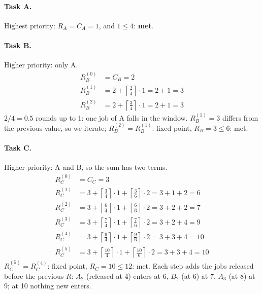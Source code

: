 \paragraph{Task A.} Highest priority: $R_A = C_A = 1$, and $1 \le 4$: \textbf{met}.

\paragraph{Task B.} Higher priority: only A.
\[
\begin{aligned}
R_B^{(0)} &= C_B = 2 \\
R_B^{(1)} &= 2 + \left\lceil \tfrac{2}{4} \right\rceil \cdot 1 = 2 + 1 = 3 \\
R_B^{(2)} &= 2 + \left\lceil \tfrac{3}{4} \right\rceil \cdot 1 = 2 + 1 = 3
\end{aligned}
\]
$2/4 = 0.5$ rounds up to 1: one job of A falls in the window. $R_B^{(1)} = 3$ differs from the previous value, so we iterate; $R_B^{(2)} = R_B^{(1)}$: fixed point, $R_B = 3 \le 6$: met.

\paragraph{Task C.} Higher priority: A and B, so the sum has two terms.
\[
\begin{aligned}
R_C^{(0)} &= C_C = 3 \\
R_C^{(1)} &= 3 + \left\lceil \tfrac{3}{4} \right\rceil \cdot 1 + \left\lceil \tfrac{3}{6} \right\rceil \cdot 2 = 3 + 1 + 2 = 6 \\
R_C^{(2)} &= 3 + \left\lceil \tfrac{6}{4} \right\rceil \cdot 1 + \left\lceil \tfrac{6}{6} \right\rceil \cdot 2 = 3 + 2 + 2 = 7 \\
R_C^{(3)} &= 3 + \left\lceil \tfrac{7}{4} \right\rceil \cdot 1 + \left\lceil \tfrac{7}{6} \right\rceil \cdot 2 = 3 + 2 + 4 = 9 \\
R_C^{(4)} &= 3 + \left\lceil \tfrac{9}{4} \right\rceil \cdot 1 + \left\lceil \tfrac{9}{6} \right\rceil \cdot 2 = 3 + 3 + 4 = 10 \\
R_C^{(5)} &= 3 + \left\lceil \tfrac{10}{4} \right\rceil \cdot 1 + \left\lceil \tfrac{10}{6} \right\rceil \cdot 2 = 3 + 3 + 4 = 10
\end{aligned}
\]
$R_C^{(5)} = R_C^{(4)}$: fixed point, $R_C = 10 \le 12$: met. Each step adds the jobs released before the previous $R$: $A_2$ (released at 4) enters at 6, $B_2$ (at 6) at 7, $A_3$ (at 8) at 9; at 10 nothing new enters.

